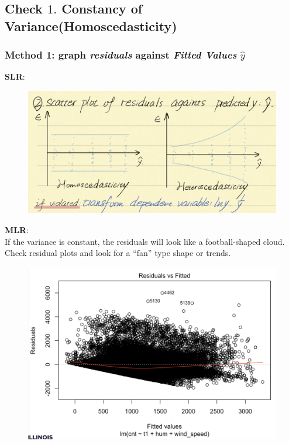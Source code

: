 \documentclass[11pt,a4paper]{article}
\begin{document}
\subsection{Check $1.$ Constancy of Variance(Homoscedasticity)}
\subsubsection{Method 1: graph \textit{residuals} against \textit{Fitted Values} $\hat{y}$}
\textbf{SLR}:
\begin{center}\begin{figure}[htbp]
    \centering
    \includegraphics[scale=0.7]{check1.png}
    \caption{}
    \label{}
\end{figure}\end{center}
\textbf{MLR}:\\
If the variance is constant, the residuals will look like a football-shaped cloud. Check residual plots and look for a “fan” type shape or trends.\\
\begin{center}\begin{figure}[htbp]
    \centering
    \includegraphics[scale=0.5]{check5}
    \caption{}
    \label{}
\end{figure}\end{center}
\end{document}
